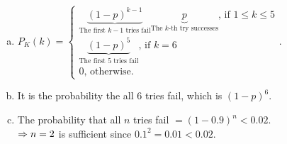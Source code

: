 \begin{pr}
\begin{enumerate}[(a)]
{\begin{tikzpicture}[auto]
%
%

\end{tikzpicture}
}
\item $P_K(k)=\begin{cases}
\underbrace{(1-p)^{k-1}}_{\text{The first }k-1\text{ tries fail}}\underbrace{p}_{\text{The }k\text{-th try successes}}\text{, if }1\leq k\leq5\\
\underbrace{(1-p)^5}_{\text{The first }5\text{ tries fail}}\text{, if }k=6\\
0\text{, otherwise}.
\end{cases}$.
\item It is the probability the all $6$ tries fail, which is $(1-p)^6$.
\item The probability that all $n$ tries fail $=(1-0.9)^n<0.02$.\\
$\then n=2$ is sufficient since $0.1^2=0.01<0.02$.
\end{enumerate}
\end{pr}
